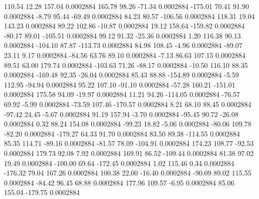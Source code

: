       110.54       12.28      157.04     0.0002884
      165.78       98.26      -71.34     0.0002884
     -175.01       70.41       91.90     0.0002884
       -8.79       95.44      -69.49     0.0002884
       84.23       80.57     -106.56     0.0002884
      118.31       19.04      143.23     0.0002884
       89.22      102.86      -10.87     0.0002884
       19.12      158.64     -159.82     0.0002884
      -80.17       89.01     -105.51     0.0002884
       99.12       91.32      -25.36     0.0002884
        1.20      116.38       90.13     0.0002884
     -104.10       87.87     -113.73     0.0002884
       84.98      108.45       -4.96     0.0002884
      -89.07       23.11        9.17     0.0002884
      -84.56       63.76       89.10     0.0002884
       -7.13       86.63      107.15     0.0002884
       89.51       63.00      179.74     0.0002884
     -103.63       71.26      -88.17     0.0002884
      -10.50      116.10       88.35     0.0002884
     -169.48       92.35      -26.04     0.0002884
       85.43       88.88     -154.89     0.0002884
       -5.59      112.95      -94.94     0.0002884
       95.22      107.10      -91.10     0.0002884
      -57.28      160.21     -151.01     0.0002884
      175.58       94.09      -19.97     0.0002884
       11.21       94.26     -114.05     0.0002884
      -76.57       69.92       -5.99     0.0002884
      -73.59      107.46     -170.57     0.0002884
        8.21       68.10       88.45     0.0002884
      -97.42       24.45       -5.67     0.0002884
       91.19      157.94       -3.70     0.0002884
      -95.45       90.72      -26.08     0.0002884
        0.32       88.24      154.08     0.0002884
      -99.23       18.82       -5.06     0.0002884
      -80.06      109.78      -82.20     0.0002884
     -179.27       64.33       91.70     0.0002884
       83.50       89.38     -114.55     0.0002884
       85.35      114.71      -89.16     0.0002884
      -81.57       78.09     -104.91     0.0002884
      174.23      108.77      -92.53     0.0002884
      179.73       92.08        7.92     0.0002884
      169.91       86.52     -109.44     0.0002884
       81.38       97.02       19.49     0.0002884
     -100.00       69.64     -172.45     0.0002884
        1.02      115.46        0.34     0.0002884
     -176.32       79.04      167.26     0.0002884
      100.38       22.00      -16.40     0.0002884
      -90.09       89.02      115.55     0.0002884
      -84.42       96.45       68.88     0.0002884
      177.96      109.57       -6.95     0.0002884
       85.06      155.04     -179.75     0.0002884
